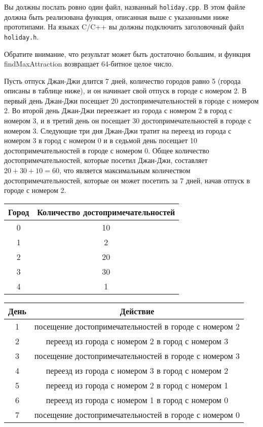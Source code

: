 Вы должны послать ровно один файл, названный \texttt{holiday.cpp}.
В этом файле должна быть реализована функция, описанная выше с указанными ниже
прототипами. На языках C/C++ вы должны подключить заголовочный файл \texttt{holiday.h}.

Обратите внимание, что результат может быть достаточно большим, и функция
findMaxAttraction возвращает 64-битное целое число.

Пусть отпуск Джан-Джи длится 7 дней, количество городов равно 5 (города описаны в таблице
ниже), и он начинает свой отпуск в городе с номером 2. В первый день Джан-Джи посещает 20
достопримечательностей в городе с номером 2. Во второй день Джан-Джи переезжает из
города с номером 2 в город с номером 3, и в третий день он посещает 30
достопримечательностей в городе с номером 3. Следующие три дня Джан-Джи тратит на
переезд из города с номером 3 в город с номером 0 и в седьмой день посещает 10
достопримечательностей в городе с номером 0. Общее количество достопримечательностей,
которые посетил Джан-Джи, составляет $20 + 30 + 10 = 60$, что является максимальным
количеством достопримечательностей, которые он может посетить за 7 дней, начав отпуск в
городе с номером 2.

\begin{center}
\renewcommand{\arraystretch}{1.5}
\begin{tabular}{|c|c|}
\hline
Город & Количество достопримечательностей \\
\hline
0 &  10 \\
\hline
1 &  2 \\
\hline
2 & 20 \\
\hline
3 & 30 \\
\hline
4 & 1 \\
\hline
\end{tabular}
\end{center}

\begin{center}
\renewcommand{\arraystretch}{1.5}
\begin{tabular}{|c|c|}
\hline
День & Действие \\
\hline
1 & посещение достопримечательностей в городе с номером 2 \\
\hline
2 & переезд из города с номером 2 в город с номером 3 \\
\hline
3 & посещение достопримечательностей в городе с номером 3 \\
\hline
4 & переезд из города с номером 3 в город с номером 2 \\
\hline
5 & переезд из города с номером 2 в город с номером 1 \\
\hline
6 & переезд из города с номером 1 в город с номером 0 \\
\hline
7 & посещение достопримечательностей в городе с номером 0 \\
\hline
\end{tabular}
\end{center}